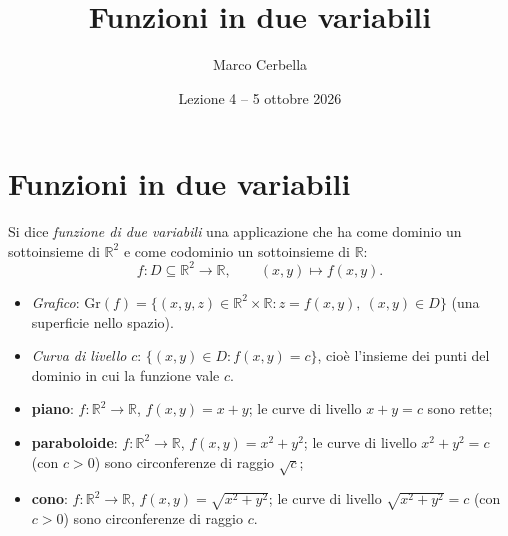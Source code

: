 \documentclass[11pt,a4paper]{article}
\title{Funzioni in due variabili}
\author{Marco Cerbella}
\date{Lezione 4 -- 5 ottobre 2026}
\begin{document}
\maketitle

\section{Funzioni in due variabili}

\begin{definizione}
Si dice \emph{funzione di due variabili} una applicazione che ha come dominio un sottoinsieme di $\mathbb{R}^2$ e come codominio un sottoinsieme di $\mathbb{R}$:
\[
f : D \subseteq \mathbb{R}^2 \to \mathbb{R}, \qquad (x, y) \mapsto f(x, y).
\]
\end{definizione}

\begin{itemize}
    \item \emph{Grafico}: $\mathrm{Gr}(f) = \{(x, y, z) \in \mathbb{R}^2 \times \mathbb{R} : z = f(x, y),\ (x, y) \in D\}$ (una superficie nello spazio).
    \item \emph{Curva di livello} $c$: $\{(x, y) \in D : f(x, y) = c\}$, cioè l'insieme dei punti del dominio in cui la funzione vale $c$.
\end{itemize}

\begin{esempio}
\leavevmode
\begin{itemize}
    \item \textbf{piano}: $f : \mathbb{R}^2 \to \mathbb{R}$, $f(x, y) = x + y$; le curve di livello $x + y = c$ sono rette;
    \item \textbf{paraboloide}: $f : \mathbb{R}^2 \to \mathbb{R}$, $f(x, y) = x^2 + y^2$; le curve di livello $x^2 + y^2 = c$ (con $c > 0$) sono circonferenze di raggio $\sqrt c$;
    \item \textbf{cono}: $f : \mathbb{R}^2 \to \mathbb{R}$, $f(x, y) = \sqrt{x^2 + y^2}$; le curve di livello $\sqrt{x^2 + y^2} = c$ (con $c > 0$) sono circonferenze di raggio $c$.
\end{itemize}
\end{esempio}
\end{document}
